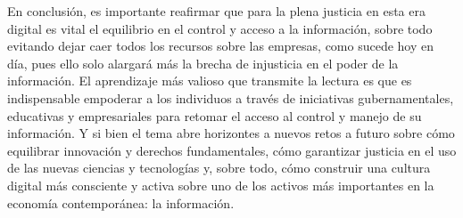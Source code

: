 \documentclass[12pt]{report}
\begin{document}
\begin{enumerate}[label=\textbf{\arabic*.}, leftmargin=*]
En conclusión, es importante reafirmar que para la plena justicia en esta era digital es vital el equilibrio en el control y acceso a la información, sobre todo evitando dejar caer todos los recursos sobre las empresas, como sucede hoy en día, pues ello solo alargará más la brecha de injusticia en el poder de la información. El aprendizaje más valioso que transmite la lectura es que es indispensable empoderar a los individuos a través de iniciativas gubernamentales, educativas y empresariales para retomar el acceso al control y manejo de su información. Y si bien el tema abre horizontes a nuevos retos a futuro sobre cómo equilibrar innovación y derechos fundamentales, cómo garantizar justicia en el uso de las nuevas ciencias y tecnologías y, sobre todo, cómo construir una cultura digital más consciente y activa sobre uno de los activos más importantes en la economía contemporánea: la información.


\end{enumerate}
\end{document}
